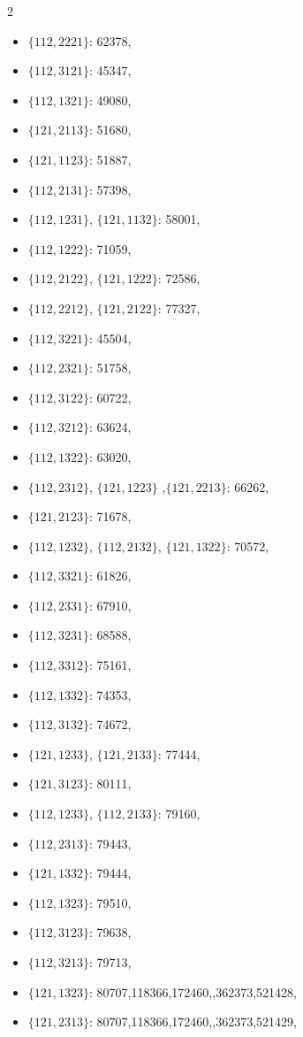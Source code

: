 \documentclass[11pt]{amsart}
\theoremstyle{plain}
\theoremstyle{definition}
\begin{document}
{\begin{multicols}{2}
\begin{itemize}
\item $\{112,2221\}$: 62378,
\item $\{112,3121\}$: 45347,
\item $\{112,1321\}$: 49080,
\item $\{121,2113\}$: 51680,
\item $\{121,1123\}$: 51887,
\item $\{112,2131\}$: 57398,
\item[$\blacksquare$] {$\{112,1231\}$, $\{121,1132\}$}: 58001,
\item $\{112,1222\}$: 71059,
\item[$\blacksquare$] {$\{112,2122\}$, $\{121,1222\}$}: 72586,
\item[$\blacksquare$] {$\{112,2212\}$, $\{121,2122\}$}: 77327,
\item $\{112,3221\}$: 45504,
\item $\{112,2321\}$: 51758,
\item $\{112,3122\}$: 60722,
\item $\{112,3212\}$: 63624,
\item $\{112,1322\}$: 63020,
\item[$\blacksquare$] {$\{112,2312\}$, $\{121,1223\}$ ,$\{121,2213\}$}: 66262,
\item $\{121,2123\}$: 71678,
\item[$\blacksquare$] {$\{112,1232\}$, $\{112,2132\}$, $\{121,1322\}$}: 70572,
\item $\{112,3321\}$: 61826,
\item $\{112,2331\}$: 67910,
\item $\{112,3231\}$: 68588,
\item $\{112,3312\}$: 75161,
\item $\{112,1332\}$: 74353,
\item $\{112,3132\}$: 74672,
\item[$\blacksquare$] {$\{121,1233\}$, $\{121,2133\}$}: 77444,
\item $\{121,3123\}$: 80111,
\item[$\blacksquare$] {$\{112,1233\}$, $\{112,2133\}$}: 79160,
\item $\{112,2313\}$: 79443,
\item $\{121,1332\}$: 79444,
\item $\{112,1323\}$: 79510,
\item $\{112,3123\}$: 79638,
\item $\{112,3213\}$: 79713,
\item $\{121,1323\}$: 80707,118366,172460,,362373,521428,
\item $\{121,2313\}$: 80707,118366,172460,,362373,521429,

\end{itemize}
\end{multicols}}
\end{document}
